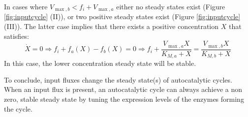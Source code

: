 \documentclass[a4page,notitlepage]{article}
\begin{document}
    In cases where $V_{\max,b}<f_i+V_{\max,a}$ either no steady states exist (Figure \ref{fig:inputcycle} (II)), or two positive steady states exist (Figure \ref{fig:inputcycle} (III)).
    The latter case implies that there exists a positive concentration $X$ that satisfies:
    \begin{equation*}
        \dot X = 0 \Rightarrow f_i + f_a(X) - f_b(X) = 0 \Rightarrow f_i+\frac{V_{\max,a}X}{K_{M,a}+X} = \frac{V_{\max,b}X}{K_{M,b}+X}
    \end{equation*}
  In this case, the lower concentration steady state will be stable.

  To conclude, input fluxes change the steady state(s) of autocatalytic cycles.
  When an input flux is present, an autocatalytic cycle can always achieve a non zero, stable steady state by tuning the expression levels of the enzymes forming the cycle.
\end{document}
